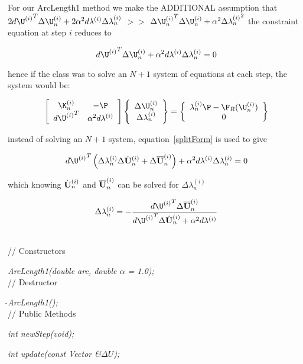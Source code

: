 \begin{enumerate}
 \noindent For our ArcLength1 method we make the ADDITIONAL assumption that
$ 2{d\U^{(i)}}^T\Delta \U_n^{(i)} 
+ 2 \alpha^2 d\lambda^{(i)} \Delta \lambda_n^{(i)} $ $>>$
$ 
\Delta {\U_n^{(i)}}^T\Delta \U_n^{(i)} +
\alpha^2 \Delta {\lambda_n^{(i)}}^2
$
the constraint equation at step $i$ reduces to

$$
{d\U^{(i)}}^T\Delta \U_n^{(i)} 
+ \alpha^2 d\lambda^{(i)} \Delta \lambda_n^{(i)} = 0
$$


\noindent hence if the class was to solve an $N+1$ system of equations at
each step, the system would be:

$$ \left[
\begin{array}{cc}
\K_n^{(i)} & -\P \\
{d\U^{(i)}}^T & \alpha^2 d\lambda^{(i)} 
\end{array} \right] 
\left\{
\begin{array}{c}
\Delta \U_n^{(i)} \\
\Delta \lambda_n^{(i)}
\end{array} \right\} = \left\{
\begin{array}{c}
\lambda_n^{(i)} \P - \F_R(\U_n^{(i)}) \\
0
\end{array} \right\}
$$


\noindent instead of solving an $N+1$ system, equation~\ref{splitForm}
is used to give

$$
{d\U^{(i)}}^T \left(\Delta \lambda_n^{(i)} \Delta \Uh_n^{(i)} + \Delta
\Ub_n^{(i)}\right) 
+ \alpha^2 d\lambda^{(i)} \Delta \lambda_n^{(i)} = 0
$$


\noindent which knowing $\dot{\bf U}_n^{(i)}$ and $\overline{\bf U}_n^{(i)}$ can
be solved for $\Delta \lambda_n^{(i)}$ 

$$
\Delta \lambda_n^{(i)} = -\frac{{d\U^{(i)}}^T \Delta \Ub_n^{(i)}}{{d\U^{(i)}}^T \Delta
\Uh_n^{(i)} + \alpha^2 d\lambda^{(i)}}
$$


\end{enumerate}
 \\
// Constructors 

{\em ArcLength1(double arc, double $\alpha$ = 1.0);}\\ 

// Destructor 

{\em $\tilde{ }$ArcLength1();}\\  

// Public Methods 

{\em int newStep(void);} 

{\em int update(const Vector \&$\Delta U$);} 

